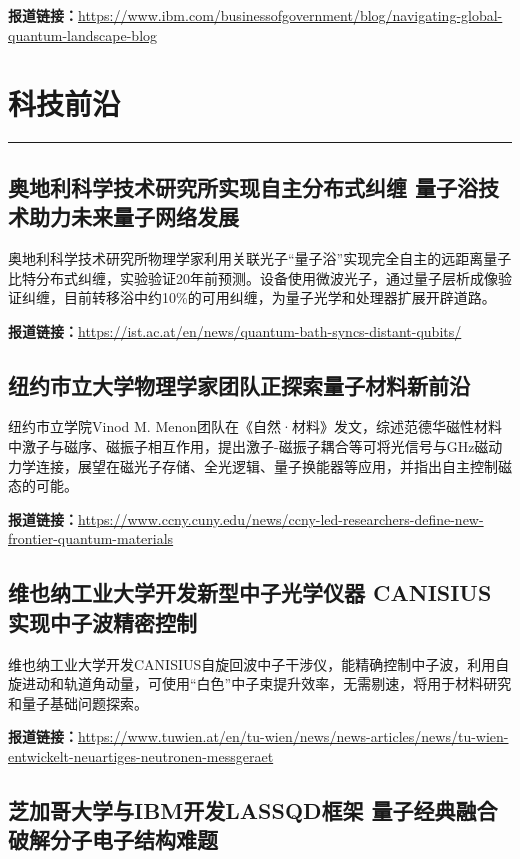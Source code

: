 \documentclass[12pt,a4paper]{ctexart}
\begin{document}
\noindent\textbf{报道链接：}\url{https://www.ibm.com/businessofgovernment/blog/navigating-global-quantum-landscape-blog}


\newpage
\section{科技前沿}
\vspace{-0.5em}
\noindent\rule{\linewidth}{1.5pt}

\subsection{ 奥地利科学技术研究所实现自主分布式纠缠 量子浴技术助力未来量子网络发展 }

奥地利科学技术研究所物理学家利用关联光子“量子浴”实现完全自主的远距离量子比特分布式纠缠，实验验证20年前预测。设备使用微波光子，通过量子层析成像验证纠缠，目前转移浴中约10\%的可用纠缠，为量子光学和处理器扩展开辟道路。

\noindent\textbf{报道链接：}\url{https://ist.ac.at/en/news/quantum-bath-syncs-distant-qubits/}

\subsection{ 纽约市立大学物理学家团队正探索量子材料新前沿 }

纽约市立学院Vinod M. Menon团队在《自然·材料》发文，综述范德华磁性材料中激子与磁序、磁振子相互作用，提出激子-磁振子耦合等可将光信号与GHz磁动力学连接，展望在磁光子存储、全光逻辑、量子换能器等应用，并指出自主控制磁态的可能。

\noindent\textbf{报道链接：}\url{https://www.ccny.cuny.edu/news/ccny-led-researchers-define-new-frontier-quantum-materials}

\subsection{ 维也纳工业大学开发新型中子光学仪器 CANISIUS实现中子波精密控制 }

维也纳工业大学开发CANISIUS自旋回波中子干涉仪，能精确控制中子波，利用自旋进动和轨道角动量，可使用“白色”中子束提升效率，无需剔速，将用于材料研究和量子基础问题探索。

\noindent\textbf{报道链接：}\url{https://www.tuwien.at/en/tu-wien/news/news-articles/news/tu-wien-entwickelt-neuartiges-neutronen-messgeraet}

\subsection{ 芝加哥大学与IBM开发LASSQD框架 量子经典融合破解分子电子结构难题 }
\end{document}
